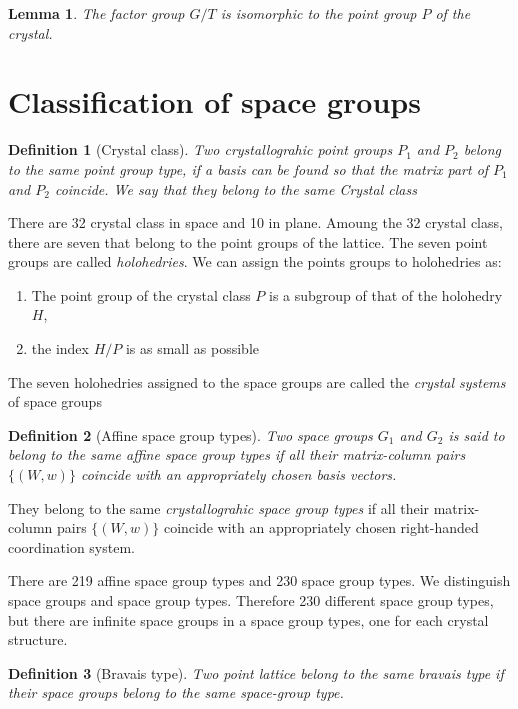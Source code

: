 \documentclass{amsart}
\newtheorem{definition}{Definition}
\newtheorem{lemma}{Lemma}
\begin{document}
\begin{lemma}
    The factor group $G/T$ is isomorphic to the point group $P$ of the crystal.
\end{lemma}

\vspace{10pt}

\section*{Classification of space groups}
\begin{definition}
    [Crystal class]
    Two crystallograhic point groups $P_1$ and $P_2$ belong to the same point group type, if a basis can be found 
    so that the matrix part of $P_1$ and $P_2$ coincide. We say that they belong to the same \emph{Crystal class}
\end{definition}
There are 32 crystal class in space and 10 in plane.
Amoung the 32 crystal class, there are seven that belong to the point groups of the lattice. The seven point groups 
are called \emph{holohedries}. We can assign the points groups to holohedries as:
\begin{enumerate}
    \item The point group of the crystal class $P$ is a subgroup of that of the holohedry $H$,
    \item the index $H/P$ is as small as possible
\end{enumerate}
The seven holohedries assigned to the space groups are called the \emph{crystal systems} of space groups

\vspace{10pt}

\begin{definition}
    [Affine space group types]
    Two space groups $G_1$ and $G_2$ is said to belong to the same affine space group types if 
    all their matrix-column pairs $\{(W,w)\}$ coincide with an appropriately chosen basis vectors. 
\end{definition}
They belong to the same \emph{crystallograhic space group types} if 
all their matrix-column pairs $\{(W,w)\}$ coincide with an appropriately chosen right-handed coordination system.

There are 219 affine space group types and 230 space group types. 
We distinguish space groups and space group types. Therefore 230 different space group types, but there are 
infinite space groups in a space group types, one for each crystal structure.

\begin{definition}
    [Bravais type]
    Two point lattice belong to the same bravais type if their space groups belong to the same space-group type.
\end{definition}
\end{document}
